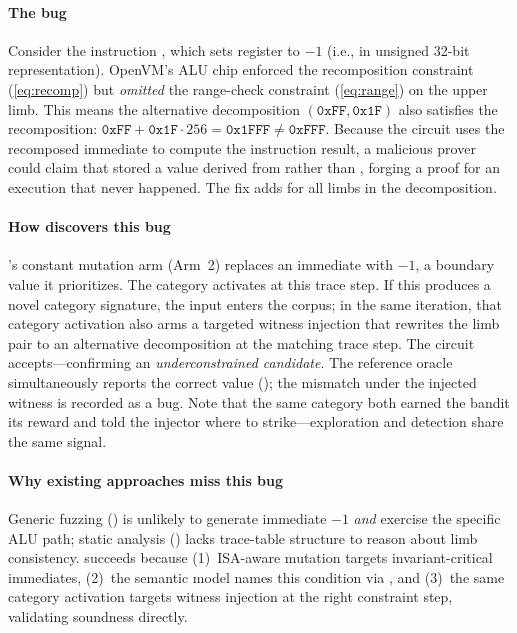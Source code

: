 \paragraph{The bug}
Consider the instruction , which sets register  to $-1$ (i.e.,  in unsigned 32-bit representation). OpenVM's ALU chip enforced the recomposition constraint (\autoref{eq:recomp}) but \emph{omitted} the range-check constraint (\autoref{eq:range}) on the upper limb. This means the alternative decomposition $(\texttt{0xFF}, \texttt{0x1F})$ also satisfies the recomposition: $\texttt{0xFF} + \texttt{0x1F} \cdot 256 = \texttt{0x1FFF} \neq \texttt{0xFFF}$. Because the circuit uses the recomposed immediate to compute the instruction result, a malicious prover could claim that  stored a value derived from  rather than , forging a proof for an execution that never happened. The fix adds  for all limbs in the decomposition.

\paragraph{How \tool discovers this bug}
\tool's constant mutation arm (Arm~2) replaces an immediate with $-1$, a boundary value it prioritizes. The  category activates at this trace step. If this produces a novel category signature, the input enters the corpus; in the same iteration, that category activation also arms a targeted witness injection that rewrites the limb pair to an alternative decomposition at the matching trace step. The circuit accepts---confirming an \emph{underconstrained candidate}. The reference oracle simultaneously reports the correct value (); the mismatch under the injected witness is recorded as a bug. Note that the same category both earned the bandit its reward and told the injector where to strike---exploration and detection share the same signal.

\paragraph{Why existing approaches miss this bug}
Generic fuzzing (\arguzz) is unlikely to generate immediate $-1$ \emph{and} exercise the specific ALU path; static analysis (\zkap) lacks trace-table structure to reason about limb consistency. \tool succeeds because (1)~ISA-aware mutation targets invariant-critical immediates, (2)~the semantic model names this condition via , and (3)~the same category activation targets witness injection at the right constraint step, validating soundness directly.

